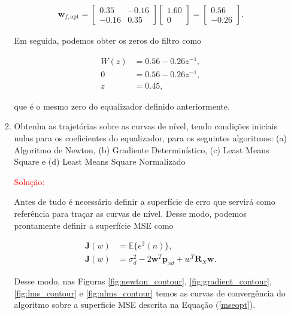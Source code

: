 \documentclass[a4paper,10pt]{article}
\begin{document}
\begin{enumerate}
\begin{enumerate}
						\begin{align}
							\mathbf{w}_{f,\text{opt}} = 
							\begin{bmatrix}
								0.35 & -0.16 \\
								-0.16 & 0.35
							\end{bmatrix}
							\begin{bmatrix}
								1.60 \\
								0
							\end{bmatrix} =
							\begin{bmatrix}
								0.56 \\
								-0.26
							\end{bmatrix}.
						\end{align}

						Em seguida, podemos obter os zeros do filtro como

						\begin{align}
							W(z) &= 0.56 - 0.26 z^{-1}, \\
							0 &= 0.56 - 0.26 z^{-1}, \\
							z &= 0.45,
						\end{align}

						que é o mesmo zero do equalizador definido anteriormente.

					\newpage
					\item Obtenha as trajetórias sobre as curvas de nível, tendo condições iniciais nulas para os coeﬁcientes do equalizador, para os seguintes algoritmos: (a) Algoritmo de Newton, (b) Gradiente Determinístico, (c) Least Means Square e (d) Least Means Square Normalizado
						
						\textcolor{red}{Solução:}
						
						Antes de tudo é necessário definir a superfície de erro que servirá como referência para traçar as curvas de nível. Desse modo, podemos prontamente
						definir a superfície MSE como
						
						\begin{align}
							\mathbf{J}(w) &= \mathbb{E}\{e^{2}(n)\}, \\
							\mathbf{J}(w) &= \sigma^{2}_{d} - 2\mathbf{w}^{T}\mathbf{p}_{xd} + w^{T}\mathbf{R}_{X}\mathbf{w}. \label{mseopt}  
						\end{align}
						
						Desse modo, nas Figuras \ref{fig:newton_contour}, \ref{fig:gradient_contour}, \ref{fig:lms_contour} e \ref{fig:nlms_contour} temos as curvas de convergência do algoritmo sobre a superficie MSE descrita na Equação (\ref{mseopt}). 


\end{enumerate}
\end{enumerate}
\end{document}

